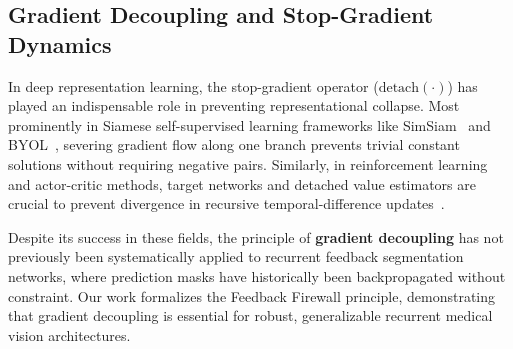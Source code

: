 \subsection{Gradient Decoupling and Stop-Gradient Dynamics}
In deep representation learning, the stop-gradient operator ($\text{detach}(\cdot)$) has played an indispensable role in preventing representational collapse. Most prominently in Siamese self-supervised learning frameworks like SimSiam~\cite{chen2021exploring} and BYOL~\cite{grill2020bootstrap}, severing gradient flow along one branch prevents trivial constant solutions without requiring negative pairs. Similarly, in reinforcement learning and actor-critic methods, target networks and detached value estimators are crucial to prevent divergence in recursive temporal-difference updates~\cite{mnih2015human}. 

Despite its success in these fields, the principle of \textbf{gradient decoupling} has not previously been systematically applied to recurrent feedback segmentation networks, where prediction masks have historically been backpropagated without constraint. Our work formalizes the Feedback Firewall principle, demonstrating that gradient decoupling is essential for robust, generalizable recurrent medical vision architectures.
